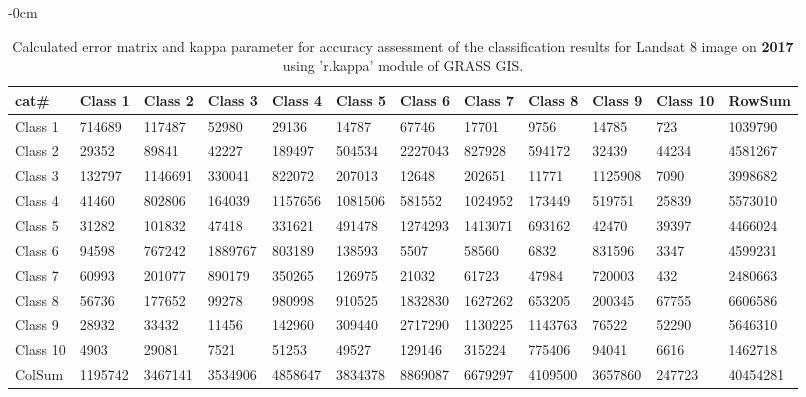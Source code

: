 \documentclass[analytics,article,submit,pdftex,moreauthors]{Definitions/mdpi}
\begin{document}
\begin{table}[H] 
\footnotesize
    \centering
    \begin{adjustwidth}{-\extralength}{0cm}
    \caption{Calculated error matrix and kappa parameter for accuracy assessment of the classification results for Landsat 8 image on \textbf{2017} using 'r.kappa' module of GRASS GIS.\label{tab03}}
 	\begin{tabularx}{\fulllength}{|l|l|l|l|l|l|l|l|l|l|l|l|}
    \toprule
        cat\# & \textbf{Class 1} & \textbf{Class 2} & \textbf{Class 3} & \textbf{Class 4} & \textbf{Class 5} & \textbf{Class 6} & \textbf{Class 7} & \textbf{Class 8} & \textbf{Class 9} & \textbf{Class 10} & \textbf{RowSum} \\ \hline
        Class 1 & \cellcolor{green!10}714689 & 117487 & 52980 & 29136 & 14787 & 67746 & 17701 & 9756 & 14785 & 723 & 1039790 \\ \hline
        Class 2 & 29352 & \cellcolor{green!10}89841 & 42227 & 189497 & 504534 & 2227043 & 827928 & 594172 & 32439 & 44234 & 4581267 \\ \hline
        Class 3 & 132797 & 1146691 & \cellcolor{green!10}330041 & 822072 & 207013 & 12648 & 202651 & 11771 & 1125908 & 7090 & 3998682 \\ \hline
        Class 4 & 41460 & 802806 & 164039 & \cellcolor{green!10}1157656 & 1081506 & 581552 & 1024952 & 173449 & 519751 & 25839 & 5573010 \\ \hline
        Class 5 & 31282 & 101832 & 47418 & 331621 & \cellcolor{green!10}491478 & 1274293 & 1413071 & 693162 & 42470 & 39397 & 4466024 \\ \hline
        Class 6 & 94598 & 767242 & 1889767 & 803189 & 138593 & \cellcolor{green!10}5507 & 58560 & 6832 & 831596 & 3347 & 4599231 \\ \hline
        Class 7 & 60993 & 201077 & 890179 & 350265 & 126975 & 21032 & \cellcolor{green!10}61723 & 47984 & 720003 & 432 & 2480663 \\ \hline
        Class 8 & 56736 & 177652 & 99278 & 980998 & 910525 & 1832830 & 1627262 & \cellcolor{green!10}653205 & 200345 & 67755 & 6606586 \\ \hline
        Class 9 & 28932 & 33432 & 11456 & 142960 & 309440 & 2717290 & 1130225 & 1143763 & \cellcolor{green!10}76522 & 52290 & 5646310 \\ \hline
        Class 10 & 4903 & 29081 & 7521 & 51253 & 49527 & 129146 & 315224 & 775406 & 94041 & \cellcolor{green!10}6616 & 1462718 \\ \hline
        ColSum & 1195742 & 3467141 & 3534906 & 4858647 & 3834378 & 8869087 & 6679297 & 4109500 & 3657860 & 247723 & \cellcolor{green!10}40454281 \\ \hline
        \bottomrule
    \end{tabularx}
    \end{adjustwidth}
\end{table}
\end{document}
